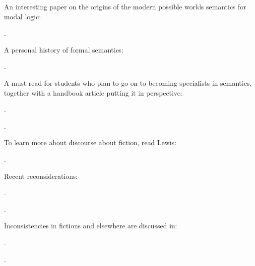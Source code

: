 {An interesting paper on the origins of the modern possible worlds
semantics for modal logic:
\begin{bibentrylist}
	\item {}.
\end{bibentrylist}

A personal history of formal semantics:
\begin{bibentrylist}
	\item {}.
\end{bibentrylist}

A must read for students who plan to go on to becoming specialists in
semantics, together with a handbook article putting it in perspective:
\begin{bibentrylist}
	\item {}. 
	\item {}. 
\end{bibentrylist}

To learn more about discourse about fiction, read Lewis:
\begin{bibentrylist}
	\item {}. 
\end{bibentrylist}

Recent reconsiderations:
\begin{bibentrylist}
	\item {}. 
	\item {}.
\end{bibentrylist}

  

Inconsistencies in fictions and elsewhere are discussed in:
\begin{bibentrylist}
	\item {}. 
	\item {}. 
\end{bibentrylist}

}
